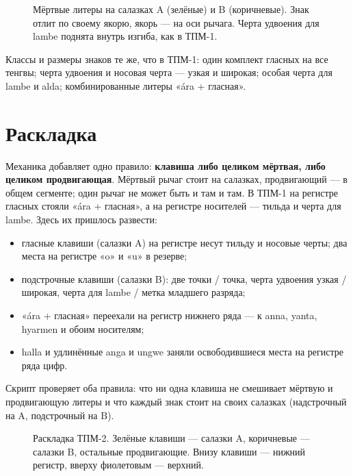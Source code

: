 \begin{figure}[h]
\centering
\setlength\tgem{24mm}
\begin{tikzpicture}[x=\tgu,y=\tgu]

\end{tikzpicture}
\caption{Мёртвые литеры на салазках A (зелёные) и B (коричневые). Знак отлит по своему якорю, якорь — на оси рычага. Черта удвоения для lambe поднята внутрь изгиба, как в ТПМ-1.}
\end{figure}

Классы и размеры знаков те же, что в ТПМ-1: один комплект гласных на все тенгвы; черта удвоения и носовая черта — узкая и широкая; особая черта для lambe и alda; комбинированные литеры «ára + гласная».

\section{Раскладка}

Механика добавляет одно правило: \textbf{клавиша либо целиком мёртвая, либо целиком продвигающая}. Мёртвый рычаг стоит на салазках, продвигающий — в общем сегменте; один рычаг не может быть и там и там. В ТПМ-1 на регистре гласных стояли «ára + гласная», а на регистре носителей — тильда и черта для lambe. Здесь их пришлось развести:

\begin{itemize}
  \item гласные клавиши (салазки A) на регистре несут тильду и носовые черты; два места на регистре «o» и «u» в резерве;
  \item подстрочные клавиши (салазки B): две точки / точка, черта удвоения узкая / широкая, черта для lambe / метка младшего разряда;
  \item «ára + гласная» переехали на регистр нижнего ряда — к anna, yanta, hyarmen и обоим носителям;
  \item halla и удлинённые anga и ungwe заняли освободившиеся места на регистре ряда цифр.
\end{itemize}

Скрипт проверяет оба правила: что ни одна клавиша не смешивает мёртвую и продвигающую литеры и что каждый знак стоит на своих салазках (надстрочный на A, подстрочный на B).

\begin{figure}[h]
\centering
\begin{tikzpicture}[x=1mm,y=1mm]

\end{tikzpicture}
\caption{Раскладка ТПМ-2. Зелёные клавиши — салазки A, коричневые — салазки B, остальные продвигающие. Внизу клавиши — нижний регистр, вверху фиолетовым — верхний.}
\label{fig:kbd}
\end{figure}

